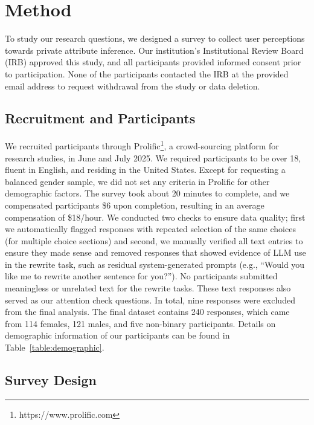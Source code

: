 \section{Method}
To study our research questions, we designed a survey to collect user perceptions towards private attribute inference. Our institution's Institutional Review Board (IRB) approved this study, and all participants provided informed consent prior to participation. None of the participants contacted the IRB at the provided email address to request withdrawal from the study or data deletion.

\subsection{Recruitment and Participants}
We recruited participants through Prolific\footnote{https://www.prolific.com}, a crowd-sourcing platform for research studies, in June and July 2025. We required participants to be over 18, fluent in English, and residing in the United States. Except for requesting a balanced gender sample, we did not set any criteria in Prolific for other demographic factors. The survey took about 20 minutes to complete, and we compensated participants \$6 upon completion, resulting in an average compensation of \$18/hour. We conducted two checks to ensure data quality; first we automatically flagged responses with repeated selection of the same choices (for multiple choice sections) and second, we manually verified all text entries to ensure they made sense and removed responses that showed evidence of LLM use in the rewrite task, such as residual system-generated prompts (e.g., ``Would you like me to rewrite another sentence for you?''). No participants submitted meaningless or unrelated text for the rewrite tasks. These text responses also served as our attention check questions. In total, nine responses were excluded from the final analysis. The final dataset contains 240 responses, which came from 114 females, 121 males, and five non-binary participants. Details on demographic information of our participants can be found in Table~\ref{table:demographic}.



\subsection{Survey Design}
